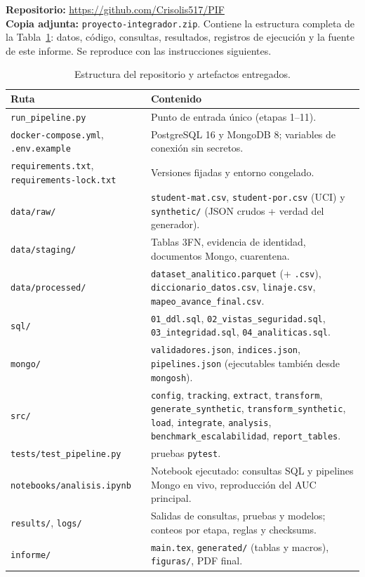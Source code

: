 \documentclass[11pt,a4paper]{article}
\newcommand{\repourl}{\url{https://github.com/Crisolis517/PIF}}
\newcommand{\repozip}{\texttt{proyecto-integrador.zip}}
\begin{document}
\textbf{Repositorio:} \repourl{}\\
\textbf{Copia adjunta:} \repozip{}. Contiene la estructura completa de la Tabla~\ref{tab:repo}: datos, código, consultas, resultados, registros de ejecución y la fuente de este informe. Se reproduce con las instrucciones siguientes.

\begin{table}[H]
\centering\scriptsize
\caption{Estructura del repositorio y artefactos entregados.}\label{tab:repo}
\begin{tabular}{>{\raggedright\arraybackslash}p{4.3cm}>{\raggedright\arraybackslash}p{10.8cm}}
\toprule
Ruta & Contenido \\
\midrule
\texttt{run\_pipeline.py} & Punto de entrada único (etapas 1–11). \\
\texttt{docker-compose.yml}, \texttt{.env.example} & PostgreSQL 16 y MongoDB 8; variables de conexión sin secretos. \\
\texttt{requirements.txt}, \texttt{requirements-lock.txt} & Versiones fijadas y entorno congelado. \\
\texttt{data/raw/} & \texttt{student-mat.csv}, \texttt{student-por.csv} (UCI) y \texttt{synthetic/} (JSON crudos + verdad del generador). \\
\texttt{data/staging/} & Tablas 3FN, evidencia de identidad, documentos Mongo, cuarentena. \\
\texttt{data/processed/} & \texttt{dataset\_analitico.parquet} (+ \texttt{.csv}), \texttt{diccionario\_datos.csv}, \texttt{linaje.csv}, \texttt{mapeo\_avance\_final.csv}. \\
\texttt{sql/} & \texttt{01\_ddl.sql}, \texttt{02\_vistas\_seguridad.sql}, \texttt{03\_integridad.sql}, \texttt{04\_analiticas.sql}. \\
\texttt{mongo/} & \texttt{validadores.json}, \texttt{indices.json}, \texttt{pipelines.json} (ejecutables también desde \texttt{mongosh}). \\
\texttt{src/} & \texttt{config}, \texttt{tracking}, \texttt{extract}, \texttt{transform}, \texttt{generate\_synthetic}, \texttt{transform\_synthetic}, \texttt{load}, \texttt{integrate}, \texttt{analysis}, \texttt{benchmark\_escalabilidad}, \texttt{report\_tables}. \\
\texttt{tests/test\_pipeline.py} & 17 pruebas \texttt{pytest}. \\
\texttt{notebooks/analisis.ipynb} & Notebook ejecutado: consultas SQL y pipelines Mongo en vivo, reproducción del AUC principal. \\
\texttt{results/}, \texttt{logs/} & Salidas de consultas, pruebas y modelos; conteos por etapa, reglas y checksums. \\
\texttt{informe/} & \texttt{main.tex}, \texttt{generated/} (tablas y macros), \texttt{figuras/}, PDF final. \\
\bottomrule
\end{tabular}
\end{table}
\end{document}
